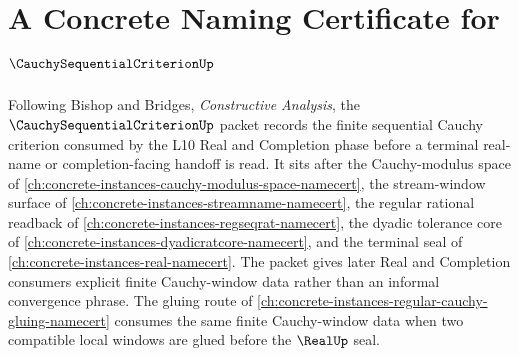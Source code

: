 \chapter{A Concrete Naming Certificate for $\CauchySequentialCriterionUp$}
\label{ch:concrete-instances-cauchy-sequential-criterion-namecert}

Following Bishop and Bridges, \emph{Constructive Analysis}, the $\CauchySequentialCriterionUp$ packet records the finite sequential Cauchy criterion consumed by the L10 Real and Completion phase before a terminal real-name or completion-facing handoff is read. It sits after the Cauchy-modulus space of \autoref{ch:concrete-instances-cauchy-modulus-space-namecert}, the stream-window surface of \autoref{ch:concrete-instances-streamname-namecert}, the regular rational readback of \autoref{ch:concrete-instances-regseqrat-namecert}, the dyadic tolerance core of \autoref{ch:concrete-instances-dyadicratcore-namecert}, and the terminal seal of \autoref{ch:concrete-instances-real-namecert}. The packet gives later Real and Completion consumers explicit finite Cauchy-window data rather than an informal convergence phrase. The gluing route of \autoref{ch:concrete-instances-regular-cauchy-gluing-namecert} consumes the same finite Cauchy-window data when two compatible local windows are glued before the $\RealUp$ seal.

